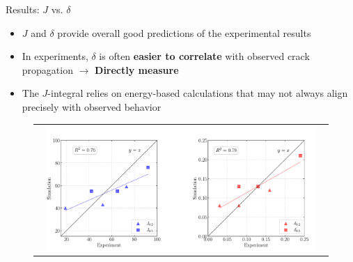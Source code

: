 \documentclass[9pt]{beamer}
\begin{document}
\begin{frame}{Results: $J$ vs. $\delta$}

\begin{itemize}
	\item $J$ and $\delta$ provide overall good predictions of the experimental results
	\vspace{0.15cm}
	\item In experiments, $\delta$ is often \textbf{easier to correlate} with observed crack propagation $\rightarrow$ \textbf{Directly measure}
	\vspace{0.15cm}
	\item The $J$-integral relies on energy-based calculations that may not always align precisely with observed behavior
\end{itemize}

\begin{figure}
        \begin{tabular}{c}
            \includegraphics[width=0.95\textwidth]{Images/fracture_toughness_exp_sim.pdf} \\
        \end{tabular}
    \end{figure}

\end{frame}

\end{document}
